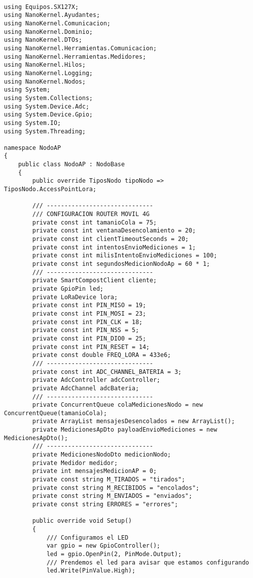 \begin{lstlisting}[caption={Ejemplo de código en C\#}]

using Equipos.SX127X;
using NanoKernel.Ayudantes;
using NanoKernel.Comunicacion;
using NanoKernel.Dominio;
using NanoKernel.DTOs;
using NanoKernel.Herramientas.Comunicacion;
using NanoKernel.Herramientas.Medidores;
using NanoKernel.Hilos;
using NanoKernel.Logging;
using NanoKernel.Nodos;
using System;
using System.Collections;
using System.Device.Adc;
using System.Device.Gpio;
using System.IO;
using System.Threading;

namespace NodoAP
{
    public class NodoAP : NodoBase
    {
        public override TiposNodo tipoNodo => TiposNodo.AccessPointLora;

        /// ------------------------------
        /// CONFIGURACION ROUTER MOVIL 4G
        private const int tamanioCola = 75; 
        private const int ventanaDesencolamiento = 20; 
        private const int clientTimeoutSeconds = 20;
        private const int intentosEnvioMediciones = 1; 
        private const int milisIntentoEnvioMediciones = 100;
        private const int segundosMedicionNodoAp = 60 * 1;
        /// ------------------------------
        private SmartCompostClient cliente;
        private GpioPin led;
        private LoRaDevice lora;
        private const int PIN_MISO = 19;
        private const int PIN_MOSI = 23;
        private const int PIN_CLK = 18;
        private const int PIN_NSS = 5;
        private const int PIN_DIO0 = 25;
        private const int PIN_RESET = 14;
        private const double FREQ_LORA = 433e6;
        /// ------------------------------
        private const int ADC_CHANNEL_BATERIA = 3;
        private AdcController adcController;
        private AdcChannel adcBateria;
        /// ------------------------------
        private ConcurrentQueue colaMedicionesNodo = new ConcurrentQueue(tamanioCola);
        private ArrayList mensajesDesencolados = new ArrayList();
        private MedicionesApDto payloadEnvioMediciones = new MedicionesApDto();
        /// ------------------------------
        private MedicionesNodoDto medicionNodo;
        private Medidor medidor;
        private int mensajesMedicionAP = 0;
        private const string M_TIRADOS = "tirados";
        private const string M_RECIBIDOS = "encolados";
        private const string M_ENVIADOS = "enviados";
        private const string ERRORES = "errores";

        public override void Setup()
        {
            /// Configuramos el LED
            var gpio = new GpioController();
            led = gpio.OpenPin(2, PinMode.Output);
            /// Prendemos el led para avisar que estamos configurando
            led.Write(PinValue.High);


\end{lstlisting}
